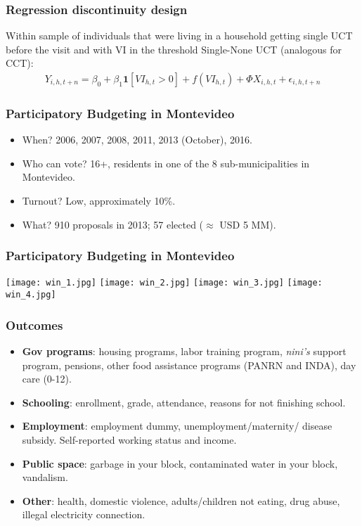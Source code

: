 \documentclass{beamer}
\begin{document}
\begin{frame}
\frametitle{Regression discontinuity design}
Within sample of individuals that were living in a household getting single UCT before the visit and with VI in the threshold Single-None UCT (analogous for CCT):
\begin{multline}
Y_{i,h,t+n} = \beta _0 + \beta_1\mathbf{1}[VI_{h,t}>0] + f(VI_{h,t}) + \Phi X_{i,h,t} + \epsilon_{i,h,t+n} 
\end{multline}
\end{frame}

\begin{frame}
\frametitle{Participatory Budgeting in Montevideo}
\begin{itemize}
	\item When? 2006, 2007, 2008, 2011, 2013 (October), 2016.
	\item Who can vote? 16+, residents in one of the 8 sub-municipalities in Montevideo.
	\item Turnout? Low, approximately 10\%.
	\item What? 910 proposals in 2013; 57 elected ($\approx$ USD 5 MM).
\end{itemize}
\end{frame}

\begin{frame}
\frametitle{Participatory Budgeting in Montevideo}
\texttt{[image: win\_1.jpg]}
\texttt{[image: win\_2.jpg]}
\texttt{[image: win\_3.jpg]}
\texttt{[image: win\_4.jpg]}
\end{frame}	

\begin{frame}
\frametitle{Outcomes}
\begin{itemize}
	\item \textbf{Gov programs}: housing programs, labor training program, \textit{nini's} support program, pensions, other food assistance programs (PANRN and INDA), day care (0-12).
	\item \textbf{Schooling}: enrollment, grade, attendance, reasons for not finishing school. 	 
	\item \textbf{Employment}: employment dummy, unemployment/maternity/ disease subsidy. Self-reported working status and income.
	\item \textbf{Public space}: garbage in your block, contaminated water in your block, vandalism.
	\item \textbf{Other}: health, domestic violence, adults/children not eating, drug abuse, illegal electricity connection.
\end{itemize}
\end{frame}
\end{document}
